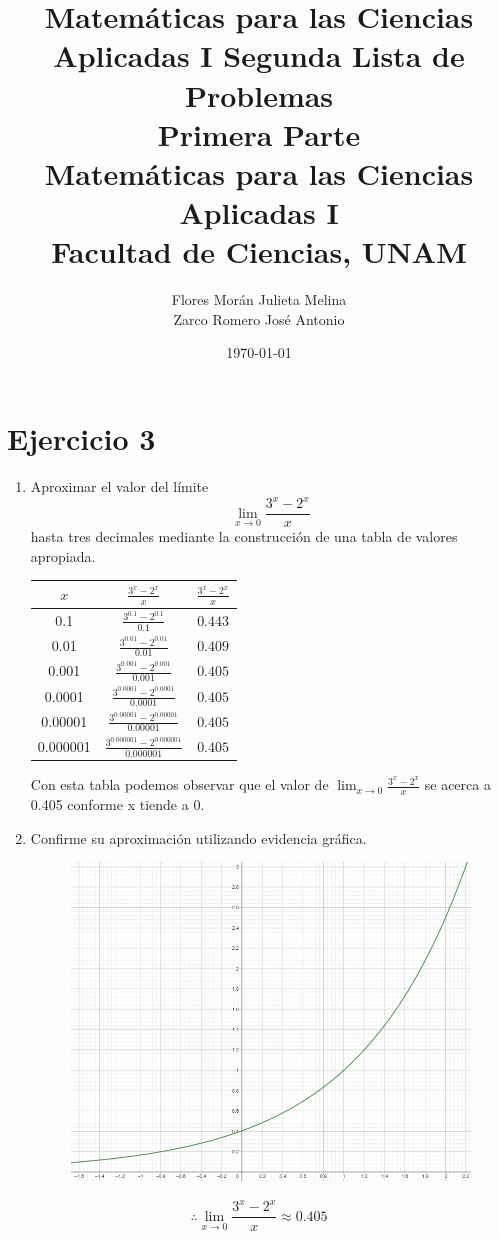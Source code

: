 \documentclass[12pt]{article}
\title{Matemáticas para las Ciencias Aplicadas I}
\title{
	Segunda Lista de Problemas \\
	\textbf{Primera Parte} \\
	\vspace{1ex}
	\large Matemáticas para las Ciencias Aplicadas I \\
	Facultad de Ciencias, UNAM}
\date{\today}
\author{Flores Morán Julieta Melina \\ Zarco Romero José Antonio}
\begin{document}
\maketitle

\section{Ejercicio 3}
\begin{enumerate}[label=(\alph*)]
\item Aproximar el valor del límite
\[
\lim_{x \to 0}\frac{3^x-2^x}{x}
\]
hasta tres decimales mediante la construcción de una tabla de valores apropiada.\\
\begin{center}
\begin{tabular}{|c|c|c|}
\hline
\(x\) & \(\frac{3^x-2^x}{x}\) & \(\frac{3^x-2^x}{x}\) \\[0.8ex] 
\hline
0.1 & \(\frac{3^{0.1}-2^{0.1}}{0.1}\) & $0.443$\\ [0.8ex] 
0.01 & \(\frac{3^{0.01}-2^{0.01}}{0.01}\) & $0.409$ \\[0.8ex] 
0.001 & \(\frac{3^{0.001}-2^{0.001}}{0.001}\) & $0.405$ \\[0.8ex] 
0.0001 & \(\frac{3^{0.0001}-2^{0.0001}}{0.0001}\)  & $0.405$ \\[0.8ex] 
0.00001 & \(\frac{3^{0.00001}-2^{0.00001}}{0.00001}\)& $0.405$ \\[0.8ex] 
0.000001 & \(\frac{3^{0.000001}-2^{0.000001}}{0.000001}\)& $0.405$ \\[0.8ex] 
\hline
\end{tabular}
\end{center}
Con esta tabla podemos observar que el valor de $\lim_{x \to 0}\frac{3^x-2^x}{x}$ se acerca a 0.405 conforme x tiende a 0.

\item Confirme su aproximación utilizando evidencia gráfica.
\begin{figure}[h!]
\centering
\includegraphics[width=1\textwidth]{../img/img_Lista2/ej3.png}
\end{figure}
\end{enumerate}
\[
\therefore \lim_{x \to 0}\frac{3^x-2^x}{x} \approx 0.405
\]
\end{document}
